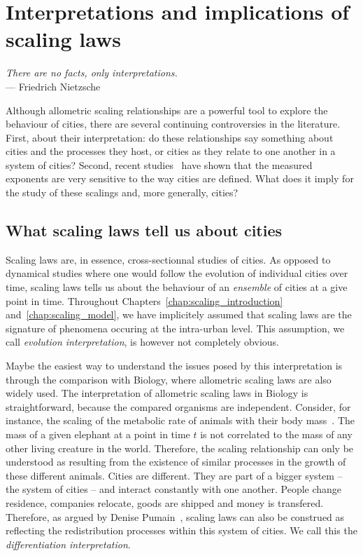 \chapter{Interpretations and implications of scaling laws}
\label{chap:scaling_implications}

\begin{flushright}{\slshape    
There are no facts, only interpretations.} \\ \medskip
--- Friedrich Nietzsche
\end{flushright}



\bigskip

Although allometric scaling relationships are a powerful tool to explore the
behaviour of cities, there are several continuing controversies in the
literature. First, about their interpretation: do these relationships say
something about cities and the processes they host, or cities as they relate to
one another in a system of cities? Second, recent
studies~\cite{Arcaute:2014,Louf:2014_mobility,Cottineau:2015} have shown that
the measured exponents are very sensitive to the way cities are defined. What
does it imply for the study of these scalings and, more generally, cities? 



\section{What scaling laws tell us about cities}

Scaling laws are, in essence, cross-sectionnal
studies of cities. As opposed to dynamical studies where one would follow the
evolution of individual cities over time, scaling laws tells us about the behaviour
of an \emph{ensemble} of cities at a give point in time. Throughout
Chapters~\ref{chap:scaling_introduction} and~\ref{chap:scaling_model}, we have
implicitely assumed that scaling laws are the signature of phenomena occuring at
the intra-urban level. This assumption, we call \emph{evolution interpretation},
is however not completely obvious. 

Maybe the easiest way to understand the issues posed by this interpretation is
through the comparison with Biology, where allometric scaling laws are also
widely used. The interpretation of allometric scaling laws in Biology is
straightforward, because the compared organisms are independent. Consider, for
instance, the scaling of the metabolic rate of animals with their body
mass~\cite{West:1997,Banavar:1999}. The mass of a given elephant at a point in
time $t$ is not correlated to the mass of any other living creature in the
world. Therefore, the scaling relationship can only be understood as resulting
from the existence  of similar processes in the growth of these different
animals.  Cities are different. They are part of a bigger system -- the system
of cities -- and interact constantly with one another. People change residence,
companies relocate, goods are shipped and money is transfered. Therefore, as
argued by Denise Pumain~\cite{Pumain:2012}, scaling laws can also be construed
as reflecting the redistribution processes within this system of cities. We call
this the \emph{differentiation interpretation}.

